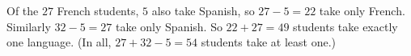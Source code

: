 Of the $27$ French students, $5$ also take Spanish, so $27-5=22$ take only French. Similarly $32-5=27$ take only Spanish. So $22+27=\boxed{49}$ students take exactly one language. (In all, $27+32-5=54$ students take at least one.)
